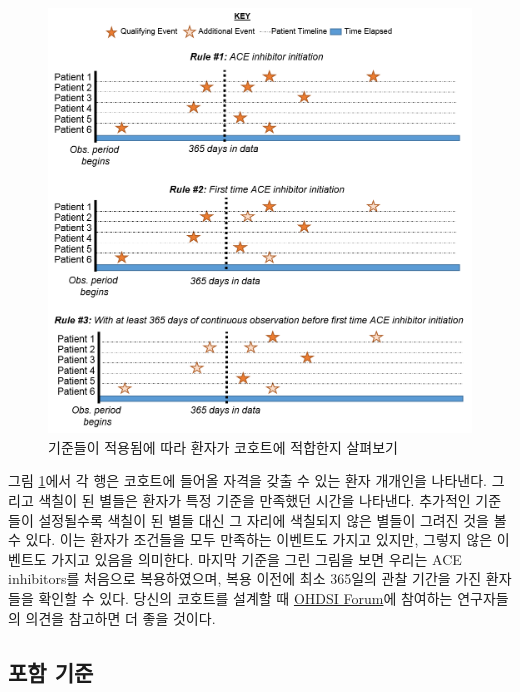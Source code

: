 \documentclass[11pt]{book}
\theoremstyle{definition}
\theoremstyle{definition}
\theoremstyle{definition}
\theoremstyle{remark}
\begin{document}
\begin{figure}

{\centering \includegraphics[width=1\linewidth]{images/Cohorts/EarliestEventExplained} 

}

\caption{기준들이 적용됨에 따라 환자가 코호트에 적합한지 살펴보기}\label{fig:EarliestEventExplained}
\end{figure}

그림 \ref{fig:EarliestEventExplained}에서 각 행은 코호트에 들어올 자격을
갖출 수 있는 환자 개개인을 나타낸다. 그리고 색칠이 된 별들은 환자가 특정
기준을 만족했던 시간을 나타낸다. 추가적인 기준들이 설정될수록 색칠이 된
별들 대신 그 자리에 색칠되지 않은 별들이 그려진 것을 볼 수 있다. 이는
환자가 조건들을 모두 만족하는 이벤트도 가지고 있지만, 그렇지 않은
이벤트도 가지고 있음을 의미한다. 마지막 기준을 그린 그림을 보면 우리는
ACE inhibitors를 처음으로 복용하였으며, 복용 이전에 최소 365일의 관찰
기간을 가진 환자들을 확인할 수 있다. 당신의 코호트를 설계할 때
\href{http://forums.ohdsi.org}{OHDSI Forum}에 참여하는 연구자들의 의견을
참고하면 더 좋을 것이다.

\subsection{포함 기준}\label{-}
\end{document}
